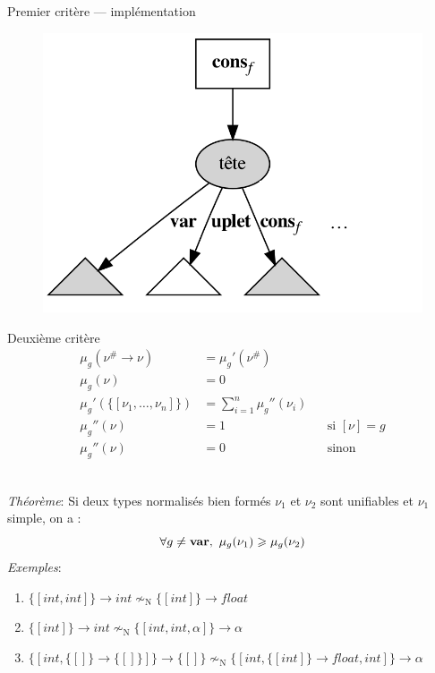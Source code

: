 \documentclass[serif]{beamer}
\newcommand{\exemples}{\textit{Exemples}\xspace}
\newcommand{\theoreme}{\textit{Théorème}\xspace}
\newcommand{\interval}[2]{[\![#1\,;#2]\!]}
\newcommand{\mset}[1]{\{\![#1]\!\}}
\newcommand{\N}{\mathrm{N}}
\begin{document}
\begin{frame}{Premier critère — implémentation}
\begin{figure}[h]
	\includegraphics[scale=0.12]{graphs/crit1_3}
\end{figure}
\end{frame}


\begin{frame}{Deuxième critère}
\scriptsize
\begin{align*}
		\mu_g (\nu^\# \rightarrow \nu) &=
		\mu_g' (\nu^\#)
	\\
		\mu_g (\nu) &=
		0
	\\
		\mu_g' (\mset{\nu_1, \dots, \nu_n}) &=
		\sum_{i=1}^n \mu_g'' (\nu_i)
	\\
		\mu_g'' (\nu) &=
		1 &&
		\text{si } [\nu] = g
	\\
		\mu_g'' (\nu) &=
		0 &&
		\text{sinon}
\end{align*}
\medskip
{}
\\
\theoreme : Si deux types normalisés bien formés $\nu_1$ et $\nu_2$ sont unifiables et $\nu_1$ simple, on a :
\[ \forall g \neq \bold{var},\ \mu_g (\nu_1) \geqslant \mu_g (\nu_2) \]
\exemples :
\begin{enumerate}
	\item $\mset{int, int} \rightarrow int \nsim_\N \mset{int} \rightarrow float$
	\item $\mset{int} \rightarrow int \nsim_\N \mset{int, int, \alpha} \rightarrow \alpha$
	\item $\mset{int, \mset{} \rightarrow \mset{}} \rightarrow \mset{} \nsim_\N \mset{int, \mset{int} \rightarrow float, int} \rightarrow \alpha$
\end{enumerate}
\end{frame}
\end{document}
